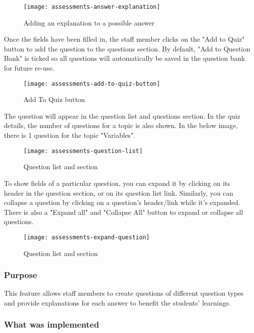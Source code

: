 \begin{figure}[h!]
	\centering
	\texttt{[image: assessments-answer-explanation]}
	\caption{Adding an explanation to a possible answer}
\end{figure}

Once the fields have been filled in, the staff member clicks on the "Add to Quiz" button to add the question to the questions section. By default, "Add to Question Bank" is ticked so all questions will automatically be saved in the question bank for future re-use.

\begin{figure}[h!]
	\centering
	\texttt{[image: assessments-add-to-quiz-button]}
	\caption{Add To Quiz button}
\end{figure}

The question will appear in the question list and questions section. In the quiz details, the number of questions for a topic is also shown. In the below image, there is 1 question for the topic "Variables".

\begin{figure}[!hbpt]
	\centering
	\texttt{[image: assessments-question-list]}
	\caption{Question list and section}
\end{figure}

To show fields of a particular question, you can expand it by clicking on its header in the question section, or on its question list link. Similarly, you can collapse a question by clicking on a question's header/link while it's expanded. There is also a "Expand all" and "Collapse All" button to expand or collapse all questions.

\begin{figure}[h!]
	\centering
	\texttt{[image: assessments-expand-question]}
	\caption{Question list and section}
\end{figure}

\subsubsection{Purpose}
This feature allows staff members to create questions of different question types and provide explanations for each answer to benefit the students' learnings. 

\subsubsection{What was implemented}

